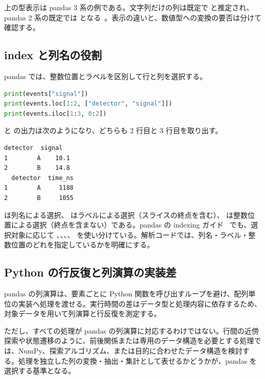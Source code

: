 上の型表示は pandas 3 系の例である。文字列だけの列は既定で  と推定され、pandas 2 系の既定では  となる~\cite{pandas_migration3}。表示の違いと、数値型への変換の要否は分けて確認する。

\subsection{index と列名の役割}

pandas では、整数位置とラベルを区別して行と列を選択する。

\begin{lstlisting}[language=Python]
print(events["signal"])
print(events.loc[1:2, ["detector", "signal"]])
print(events.iloc[1:3, 0:2])
\end{lstlisting}

 と  の出力は次のようになり、どちらも 2 行目と 3 行目を取り出す。

\begin{lstlisting}[numbers=none, xleftmargin=2\zw]
  detector  signal
1        A    10.1
2        B    14.8
  detector  time_ns
1        A     1188
2        B     1055
\end{lstlisting}

 は列名による選択、 はラベルによる選択（スライスの終点を含む）、 は整数位置による選択（終点を含まない）である。pandas の indexing ガイド~\cite{pandas_indexing} でも、選択対象に応じて \code{[]}、、、、 を使い分けている。解析コードでは、列名・ラベル・整数位置のどれを指定しているかを明確にする。

\subsection{Python の行反復と列演算の実装差}

pandas の列演算は、要素ごとに Python 関数を呼び出すループを避け、配列単位の実装へ処理を渡せる。実行時間の差はデータ型と処理内容に依存するため、対象データを用いて列演算と行反復を測定する。

ただし、すべての処理が pandas の列演算に対応するわけではない。行間の近傍探索や状態遷移のように、前後関係または専用のデータ構造を必要とする処理では、NumPy、探索アルゴリズム、または目的に合わせたデータ構造を検討する。処理を独立した列の変換・抽出・集計として表せるかどうかが、pandas を選択する基準となる。

